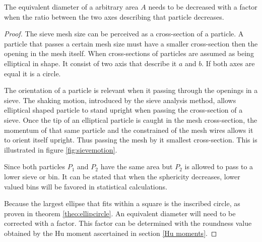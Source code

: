 \documentclass[11pt,fleqn,,a4paper,twoside,openright]{book}
\begin{document}
\begin{theorem}\label{theo:CorrBetweensphereandpart}
	The equivalent diameter of a arbitrary area $ A $ needs to be decreased with a factor when the ratio between the two axes describing that particle decreases.  
	
	\begin{proof}
			The sieve mesh size can be perceived as a cross-section of a particle. A particle that passes a certain mesh size must have a smaller cross-section then the opening in the mesh itself. When cross-sections of particles are assumed as being elliptical in shape. It consist of two axis that describe it $ a $ and $ b $. If both axes are equal it is a circle. 
			
			The orientation of a particle is relevant when it passing through the openings in a sieve. The shaking motion, introduced by the sieve analysis method, allows elliptical shaped particle to stand upright when passing the cross-section of a sieve. Once the tip of an elliptical particle is caught in the mesh cross-section, the momentum of that same particle and the constrained of the mesh wires allows it to orient itself upright. Thus passing the mesh by it smallest cross-section. This is illustrated in figure \ref{fig:sievemotion}.
			
			Since both particles $ P_1 $ and $ P_2 $ have the same area but $ P_2 $ is allowed to pass to a lower sieve or bin. It can be stated that when the sphericity decreases, lower valued bins will be favored in statistical calculations.
			
			Because the largest ellipse that fits within a square is the inscribed circle, as proven in theorem \ref{theo:ellipcircle}. An equivalent diameter will need to be corrected with a factor. This factor can be determined with the roundness value obtained by the Hu moment ascertained in section \ref{Hu moments}. 
	\end{proof}

\end{theorem}
\end{document}
